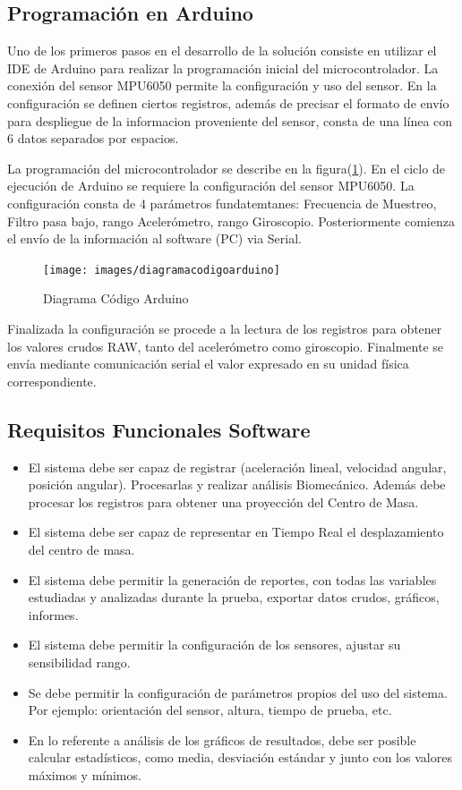 \documentclass[12pt,a4paper]{article}
\begin{document}
\subsection{Programación en Arduino}
Uno de los primeros pasos en el desarrollo de la solución consiste en utilizar el IDE de Arduino para realizar la programación inicial del microcontrolador. La conexión del sensor MPU6050 permite la configuración y uso del sensor.
En la configuración se definen ciertos registros, además de precisar el formato de envío para despliegue de la informacion proveniente del sensor, consta de una línea con 6 datos separados por espacios.

La programación del microcontrolador se describe en la figura(\ref{fig:arduinocode}).
En el ciclo de ejecución de Arduino se requiere la configuración del sensor MPU6050. La configuración consta de 4 parámetros fundatemtanes: Frecuencia de Muestreo, Filtro pasa bajo, rango Acelerómetro, rango Giroscopio. Posteriormente comienza el envío de la información al software (PC) via Serial.

\begin{figure}[H]
	\centering
	\texttt{[image: images/diagramacodigoarduino]}
	\caption{Diagrama Código Arduino}
	\label{fig:arduinocode}
\end{figure}

Finalizada la configuración se procede a la lectura de los registros para obtener los valores crudos RAW, tanto del acelerómetro como giroscopio. Finalmente se envía mediante comunicación serial el valor expresado en su unidad física correspondiente.

\subsection{Requisitos Funcionales Software}
\begin{itemize}
	\item El sistema debe ser capaz de registrar (aceleración lineal, velocidad angular, posición angular). Procesarlas y realizar análisis Biomecánico. Además debe procesar los registros para obtener una proyección del Centro de Masa.
	\item El sistema debe ser capaz de representar en Tiempo Real el desplazamiento del centro de masa.
	\item El sistema debe permitir la generación de reportes, con todas las variables estudiadas y analizadas durante la prueba, exportar datos crudos, gráficos, informes.
	\item El sistema debe permitir la configuración de los sensores, ajustar su sensibilidad rango.
	\item Se debe permitir la configuración de parámetros propios del uso del sistema. Por ejemplo: orientación del sensor, altura, tiempo de prueba, etc.
	\item En lo referente a análisis de los gráficos de resultados, debe ser posible calcular estadísticos, como media, desviación estándar y junto con los valores máximos y mínimos.
\end{itemize} 
\end{document}
